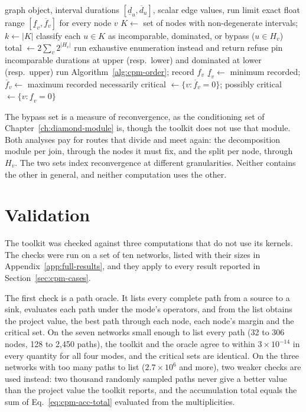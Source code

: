 \documentclass[12pt]{report}
\begin{document}
\begin{algorithm}[htbp]
\caption{Domination split for exact interval floats (LongestPath, point-valued edge values)}
\label{alg:cpm-split}
\begin{algorithmic}[1]
\Require graph object, interval durations $[\underline{d}_u, \overline{d}_u]$, scalar edge
  values, run limit
\Ensure exact float range $[\underline{f}_v, \overline{f}_v]$ for every node $v$
\State $K \gets$ set of nodes with non-degenerate intervals; $k \gets |K|$
  \State classify each $u \in K$ as incomparable, dominated, or bypass ($u \in H_v$)
\EndFor
\State total $\gets 2\sum_v 2^{|H_v|}$
 run exhaustive enumeration instead and return \EndIf
{} refuse \EndIf
{}
    \State pin incomparable durations at upper (resp.\ lower) and dominated at lower (resp.\ upper)
      \State run Algorithm~\ref{alg:cpm-order}; record $f_v$
    \EndFor
  \EndFor
  \State $\underline{f}_v \gets$ minimum recorded; \quad $\overline{f}_v \gets$ maximum recorded
\EndFor
\State necessarily critical $\gets \{v : \overline{f}_v = 0\}$; \quad possibly critical $\gets \{v : \underline{f}_v = 0\}$
\end{algorithmic}
\end{algorithm}

The bypass set is a measure of reconvergence, as the conditioning set of
Chapter~\ref{ch:diamond-module} is, though the toolkit does not use that module. Both
analyses pay for routes that divide and meet again: the decomposition module per join,
through the nodes it must fix, and the split per node, through $H_v$. The two sets index reconvergence at different granularities. Neither contains the other
in general, and neither computation uses the other.

\section{Validation}
\label{sec:cpm-validation}

The toolkit was checked against three computations that do not use its kernels. The
checks were run on a set of ten networks, listed with their sizes in
Appendix~\ref{app:full-results}, and they apply to every result reported in
Section~\ref{sec:cpm-cases}.

The first check is a path oracle. It lists every complete path from a source to a sink,
evaluates each path under the mode's operators, and from the list obtains the project
value, the best path through each node, each node's margin and the critical set. On the
seven networks small enough to list every path (32 to 306 nodes, 128 to 2,450 paths), the
toolkit and the oracle agree to within $3 \times 10^{-14}$ in every quantity for all four
modes, and the critical sets are identical. On the three networks with too many paths to
list ($2.7 \times 10^{6}$ and more), two weaker checks are used instead: two thousand
randomly sampled paths never give a better value than the project value the toolkit
reports, and the accumulation total equals the sum of Eq.~\eqref{eq:cpm-acc-total}
evaluated from the multiplicities.
\end{document}
